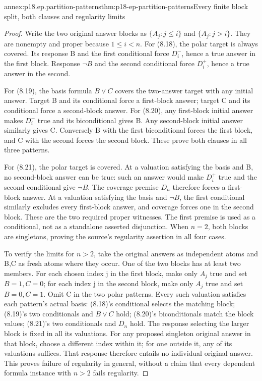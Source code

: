 \begin{annexitem}{annex:p18.ep.partition-patterns}{thm:p18-ep-partition-patterns}{Every finite block split, both clauses and regularity limits}
\begin{proof}
Write the two original answer blocks as \(\{A_j:j\leq i\}\) and
\(\{A_j:j>i\}\). They are nonempty and proper because
\(1\leq i<n\). For (8.18), the polar target is always covered.
Its response B and the first conditional force \(D^-_i\), hence
a true answer in the first block. Response \(\neg B\) and the
second conditional force \(D^+_i\), hence a true answer in the second.

For (8.19), the basis formula \(B\lor C\) covers the two-answer
target with any initial answer. Target B and its conditional force a
first-block answer; target C and its conditional force a second-block
answer. For (8.20), any first-block initial answer makes \(D^-_i\)
true and its biconditional gives B. Any second-block initial answer
similarly gives C. Conversely B with the first biconditional forces
the first block, and C with the second forces the second block.
These prove both clauses in all three patterns.

For (8.21), the polar target is covered. At a valuation satisfying
the basis and B, no second-block answer can be true: such an answer
would make \(D^+_i\) true and the second conditional give \(\neg B\).
The coverage premise \(D_n\) therefore forces a first-block answer.
At a valuation satisfying the basis and \(\neg B\), the first
conditional similarly excludes every first-block answer, and coverage
forces one in the second block. These are the two required proper
witnesses. The first premise is used as a conditional, not as a
standalone asserted disjunction. When \(n=2\), both blocks are
singletons, proving the source's regularity assertion in all four cases.

To verify the limits for \(n>2\), take the original answers as
independent atoms and B,C as fresh atoms where they occur. One of the
two blocks has at least two members. For each chosen index j in the
first block, make only \(A_j\) true and set \(B=1,C=0\); for each
index j in the second block, make only \(A_j\) true and set
\(B=0,C=1\). Omit C in the two polar patterns. Every such
valuation satisfies each pattern's actual basis: (8.18)'s conditional
selects the matching block; (8.19)'s two conditionals and \(B\lor C\)
hold; (8.20)'s biconditionals match the block values; (8.21)'s two
conditionals and \(D_n\) hold. The response selecting the larger
block is fixed in all its valuations. For any proposed singleton
original answer in that block, choose a different index within it;
for one outside it, any of its valuations suffices. That response
therefore entails no individual original answer. This proves failure
of regularity in general, without a claim that every dependent
formula instance with \(n>2\) fails regularity.
\end{proof}
\end{annexitem}

